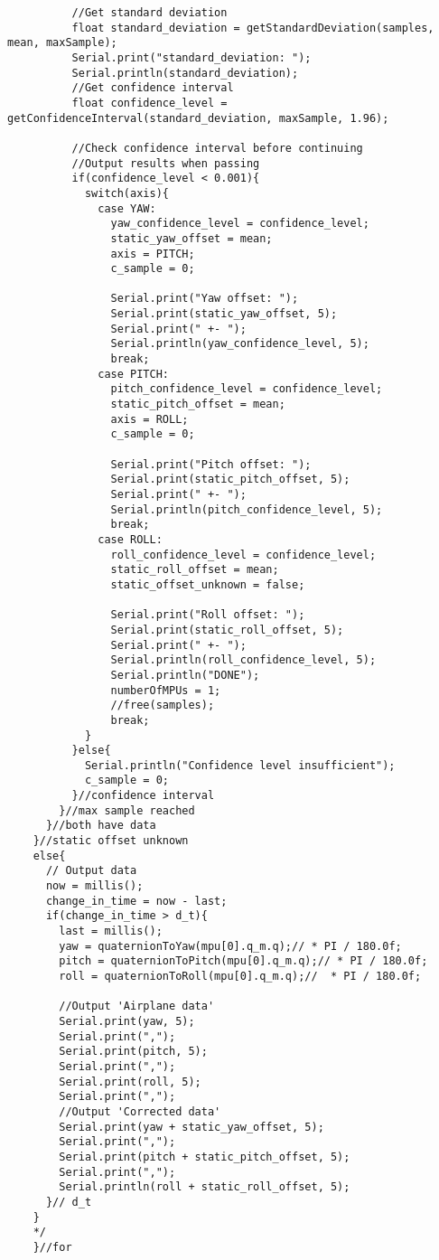\begin{lstlisting}
	      //Get standard deviation
	      float standard_deviation = getStandardDeviation(samples, mean, maxSample);
	      Serial.print("standard_deviation: ");
	      Serial.println(standard_deviation);
	      //Get confidence interval
	      float confidence_level = getConfidenceInterval(standard_deviation, maxSample, 1.96);

	      //Check confidence interval before continuing
	      //Output results when passing
	      if(confidence_level < 0.001){
	        switch(axis){
	          case YAW:
	            yaw_confidence_level = confidence_level;
	            static_yaw_offset = mean;
	            axis = PITCH;
	            c_sample = 0;

	            Serial.print("Yaw offset: ");
	            Serial.print(static_yaw_offset, 5);
	            Serial.print(" +- ");
	            Serial.println(yaw_confidence_level, 5);
	            break;
	          case PITCH:
	            pitch_confidence_level = confidence_level;
	            static_pitch_offset = mean;
	            axis = ROLL;
	            c_sample = 0;

	            Serial.print("Pitch offset: ");
	            Serial.print(static_pitch_offset, 5);
	            Serial.print(" +- ");
	            Serial.println(pitch_confidence_level, 5);
	            break;
	          case ROLL:
	            roll_confidence_level = confidence_level;
	            static_roll_offset = mean;
	            static_offset_unknown = false;

	            Serial.print("Roll offset: ");
	            Serial.print(static_roll_offset, 5);
	            Serial.print(" +- ");
	            Serial.println(roll_confidence_level, 5);
	            Serial.println("DONE");
	            numberOfMPUs = 1;
	            //free(samples);
	            break;
	        }
	      }else{
	        Serial.println("Confidence level insufficient");
	        c_sample = 0;
	      }//confidence interval
	    }//max sample reached
	  }//both have data
	}//static offset unknown
	else{
	  // Output data
	  now = millis();
	  change_in_time = now - last;
	  if(change_in_time > d_t){
	    last = millis();
	    yaw = quaternionToYaw(mpu[0].q_m.q);// * PI / 180.0f;
	    pitch = quaternionToPitch(mpu[0].q_m.q);// * PI / 180.0f;
	    roll = quaternionToRoll(mpu[0].q_m.q);//  * PI / 180.0f;

	    //Output 'Airplane data'
	    Serial.print(yaw, 5);
	    Serial.print(",");
	    Serial.print(pitch, 5);
	    Serial.print(",");
	    Serial.print(roll, 5);
	    Serial.print(",");
	    //Output 'Corrected data'
	    Serial.print(yaw + static_yaw_offset, 5);
	    Serial.print(",");
	    Serial.print(pitch + static_pitch_offset, 5);
	    Serial.print(",");
	    Serial.println(roll + static_roll_offset, 5);
	  }// d_t
	}
	*/
	}//for


\end{lstlisting}
